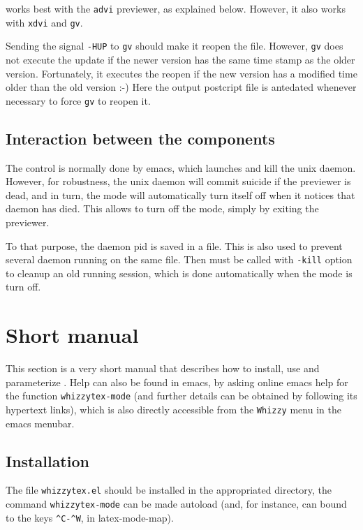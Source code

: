 \documentclass{article}
\let \lst \verb
\let \whizzy \WhizzyTeX
\begin{document}
{\whizzy} works best with the \lst"advi" previewer, as explained below. 
However, it also works with \lst"xdvi" and \lst"gv". 

Sending the signal \lst"-HUP" to \lst"gv" should make it reopen the file.
However, \lst"gv" does not execute the update if the newer version has the
same time stamp as the older version. Fortunately, it executes the reopen if
the new version has a modified time older than the old version :-) Here the
output postcript file  is antedated whenever necessary to force \lst"gv"
to reopen it.


\subsection {Interaction between the components} 

The control is normally done by emacs, which launches and kill the unix
daemon. However, for robustness, the unix daemon will commit suicide if the
previewer is dead, and in turn, the {\whizzy} mode will automatically turn
itself off when it notices that daemon has died. This allows to turn off
the {\whizzy} mode, simply by exiting the previewer.

To that purpose, the daemon pid is saved in a file. 
This is also used to prevent several daemon running on the same file. 
Then {\whizzy} must be called with \lst"-kill" option to cleanup an  old
running session, which is done automatically when the mode is turn off.


\section {Short manual} 
This section is a very short manual that describes how to install, use and
parameterize {\whizzy}. Help can also be found in emacs, by asking online
emacs help for the function \lst"whizzytex-mode" (and further details can be
obtained by following its hypertext links), which is also directly
accessible from the \lst"Whizzy" menu in the emacs menubar.

\subsection {Installation}

The file \lst"whizzytex.el" should be installed in the appropriated
directory, the command \lst"whizzytex-mode" can be made autoload (and, for
instance, can bound to the keys \lst"^C-^W", in latex-mode-map).
\end{document}
